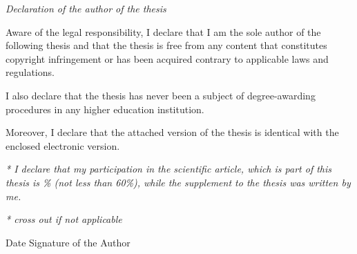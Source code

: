 \documentclass[12pt,twoside,a4paper]{article}
\begin{document}
\vspace{2.5cm}

\begin{flushleft}
\textit{Declaration of the author of the thesis}

\vspace{0.8cm}

Aware of the legal responsibility, I declare that I am the sole author of the following thesis and that
the thesis is free from any content that constitutes copyright infringement or has been acquired
contrary to applicable laws and regulations.

\vspace{0.5cm}

I also declare that the thesis has never been a subject of degree-awarding procedures in any higher
education institution.

\vspace{0.5cm}

Moreover, I declare that the attached version of the thesis is identical with the enclosed electronic
version.

\vspace{0.5cm}

\textit{* I declare that my participation in the scientific article, which is part of this thesis is \dotfill \%
(not less than 60\%), while the supplement to the thesis was written by me.}

\vspace{0.5cm}

\textit{* cross out if not applicable}

\vspace{1.5cm}

Date \hfill Signature of the Author
\end{flushleft}
\end{document}

